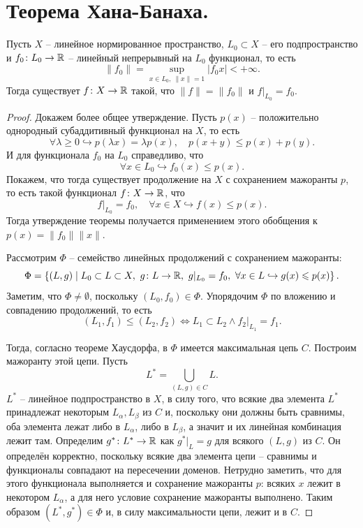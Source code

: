 \section{Теорема Хана-Банаха.}
\begin{theorem}
    Пусть $X$ -- линейное нормированное пространство, $L_0 \subset X$ -- его подпространство и $f_0\colon L_0 \to \mathbb{R}$ -- линейный непрерывный на $L_0$ функционал, то есть
    \[
        \|f_0\| = \sup_{x \in L_0, \ \|x\| = 1} |f_{0}x| < +\infty.
    \]
    Тогда существует $f\colon X \to \mathbb{R}$ такой, что $\|f\| = \|f_0\|$ и $f|_{L_0} = f_0$.
\end{theorem}
\begin{proof}
    Докажем более общее утверждение.
    Пусть $p(x)$ -- положительно однородный субаддитивный функционал на $X$, то есть
    \[
        \forall \lambda \geq 0 \hookrightarrow p(\lambda x) = \lambda p(x), \quad p(x + y) \leq p(x) + p(y).
    \]
    И для функционала $f_0$ на $L_0$ справедливо, что
    \[
        \forall x \in L_0 \hookrightarrow f_0(x) \leq p(x).
    \]
    Покажем, что тогда существует продолжение на $X$ с сохранением мажоранты $p$, то есть такой функционал $f\colon X \to \mathbb{R}$, что
    \[
        f|_{L_0} = f_0, \quad \forall x \in X \hookrightarrow f(x) \leq p(x).
    \]
    Тогда утверждение теоремы получается применением этого обобщения к $p(x) = \|f_0\|\|x\|$.

    Рассмотрим $\Phi$ -- семейство линейных продолжений с сохранением мажоранты:
    \[
        \Phi = \left\{(L, g) \mid L_0 \subset L \subset X, \  g\colon L \to \mathbb{R}, \ g|_{L_0} = f_0, \ \forall x \in L \hookrightarrow g(x) \leqslant p(x)\right\}.
    \]
    Заметим, что $\Phi \neq \emptyset$, поскольку $(L_0, f_0) \in \Phi$.
    Упорядочим $\Phi$ по вложению и совпадению продолжений, то есть
    \[
        (L_1, f_1) \leq (L_2, f_2) \Longleftrightarrow L_1 \subset L_2 \wedge f_2|_{L_1} = f_1.
    \]

    Тогда, согласно теореме Хаусдорфа, в $\Phi$ имеется максимальная цепь $C$.
    Построим мажоранту этой цепи.
    Пусть
    \[
        L^* = \bigcup_{(L, g) \in C} L.
    \]
    $L^*$ -- линейное подпространство в $X$, в силу того, что всякие два элемента $L^*$ принадлежат некоторым $L_\alpha, L_\beta$ из $C$ и, поскольку они должны быть сравнимы, оба элемента лежат либо в $L_\alpha$, либо в $L_\beta$,
    а значит и их линейная комбинация лежит там.
    Определим $g^*\colon L^* \to \mathbb{R}$ как $g^*|_{L} = g$ для всякого $(L, g)$ из $C$.
    Он определён корректно, поскольку всякие два элемента цепи -- сравнимы и функционалы совпадают на пересечении доменов.
    Нетрудно заметить, что для этого функционала выполняется и сохранение мажоранты $p$: всяких $x$ лежит в некотором $L_\alpha$, а для него условие сохранение мажоранты выполнено.
    Таким образом $(L^*, g^*) \in \Phi$ и, в силу максимальности цепи, лежит и в $C$.


\end{proof}
